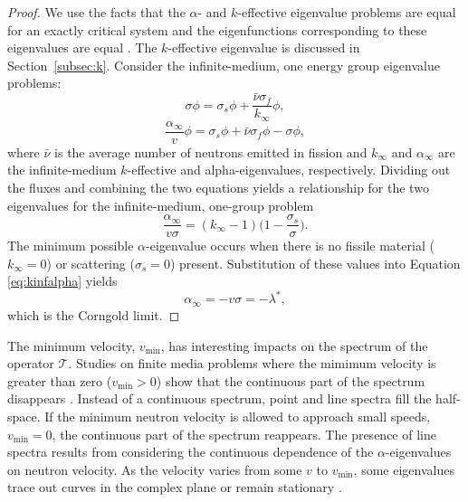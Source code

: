 \begin{proof}
	We use the facts that the $\alpha$- and $k$-effective eigenvalue problems are equal for an exactly critical system and the eigenfunctions corresponding to these eigenvalues are equal \cite{velarde_analysis_1978}. The $k$-effective eigenvalue is discussed in Section~\ref{subsec:k}. Consider the infinite-medium, one energy group eigenvalue problems:
	\begin{equation}
		\sigma \phi = \sigma_{s} \phi + \frac{\bar{\nu}\sigma_{f}}{k_{\infty}} \phi,
	\end{equation}
	\begin{equation}
		\frac{\alpha_{\infty}}{v}\phi = \sigma_{s} \phi + \bar{\nu}\sigma_{f}\phi - \sigma \phi,
	\end{equation}
where $\bar{\nu}$ is the average number of neutrons emitted in fission and $k_{\infty}$ and $\alpha_{\infty}$ are the infinite-medium $k$-effective and alpha-eigenvalues, respectively. Dividing out the fluxes and combining the two equations yields a relationship for the two eigenvalues for the infinite-medium, one-group problem \cite{kornreich_timeeigenvalue_2005}
\begin{equation}
	\frac{\alpha_{\infty}}{v\sigma} = (k_{\infty}-1) \bigg ( 1 - \frac{\sigma_{s}}{\sigma} \bigg ).
\label{eq:kinfalpha}
\end{equation}
The minimum possible $\alpha$-eigenvalue occurs when there is no fissile material ($k_{\infty} = 0$) or scattering ($\sigma_{s} = 0$) present. Substitution of these values into Equation \ref{eq:kinfalpha} yields
\begin{equation}
	\alpha_{\infty} = - v \sigma = -\lambda^{*},
\end{equation}
which is the Corngold limit.
\end{proof}

The minimum velocity, $v_{\text{min}}$, has interesting impacts on the spectrum of the operator $\mathcal{T}$. Studies on finite media problems where the mimimum velocity is greater than zero ($v_{\text{min}} > 0$) show that the continuous part of the spectrum disappears \cite{jorgens_asymptotic_1958}. Instead of a continuous spectrum, point and line spectra fill the half-space. If the minimum neutron velocity is allowed to approach small speeds, $v_{\text{min}} = 0$, the continuous part of the spectrum reappears. The presence of line spectra results from considering the continuous dependence of the $\alpha$-eigenvalues on neutron velocity. As the velocity varies from some $v$ to $v_{\text{min}}$, some eigenvalues trace out curves in the complex plane or remain stationary \cite{larsen_spectrum_1974}.

